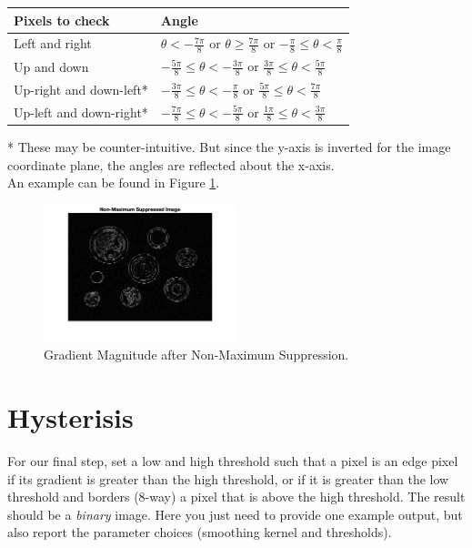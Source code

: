 \documentclass[12pt]{article}
\begin{document}
\begin{table}[h]
\centering
\begin{tabular}{|l|l|}
\hline
\textbf{Pixels to check} & \textbf{Angle}\\
\hline
Left and right & $ \theta<-\frac{7\pi}{8}$ or $\theta\geq\frac{7\pi}{8}$ or $-\frac{\pi}{8}\leq \theta < \frac{\pi}{8}$\\
Up and down & $-\frac{5\pi}{8}\leq\theta<-\frac{3\pi}{8}$ or $\frac{3\pi}{8}\leq\theta<\frac{5\pi}{8}$\\
Up-right and down-left* & $-\frac{3\pi}{8}\leq\theta<-\frac{\pi}{8}$ or $\frac{5\pi}{8}\leq\theta<\frac{7\pi}{8}$\\
Up-left and down-right* & $-\frac{7\pi}{8}\leq\theta<-\frac{5\pi}{8}$ or $\frac{1\pi}{8}\leq\theta<\frac{3\pi}{8}$\\
\hline
\end{tabular}
\end{table}


\noindent
* These may be counter-intuitive.  But since the y-axis is inverted for the image coordinate plane, the angles are reflected about the x-axis.\\

\noindent
An example can be found in Figure \ref{fig3}.

\begin{figure}[H]
\begin{center}
\includegraphics[width=0.5\textwidth]{nms_mag.png}
\caption{Gradient Magnitude after Non-Maximum Suppression.}
\label{fig3}
\end{center}
\end{figure}
\newpage
\section{Hysterisis}
For our final step, set a low and high threshold such that a pixel is an edge pixel if its gradient is greater than the high threshold, or if it is greater than the low threshold and borders (8-way) a pixel that is above the high threshold.  The result should be a \emph{binary} image.  Here you just need to provide one example output, but also report the parameter choices (smoothing kernel and thresholds).\\
\end{document}

